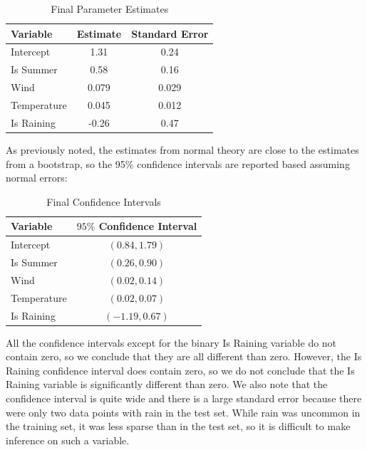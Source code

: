 \documentclass{article}
\begin{document}
\begin{table}
\centering
\begin{tabular}{ | l | c | c |}\hline
  Variable & Estimate & Standard Error \\ \hline
  Intercept & 1.31 & 0.24 \\
  Is Summer & 0.58 & 0.16 \\
  Wind & 0.079 & 0.029 \\
  Temperature & 0.045 & 0.012 \\
  Is Raining & -0.26 &   0.47 \\
  \hline
\end{tabular}
\caption{Final Parameter Estimates}
\label{Parameter Estimates}
\end{table}


As previously noted, the estimates from normal theory are close to the estimates from a bootstrap, so the 95\% confidence intervals are reported based assuming normal errors:
\begin{table}
\centering
\begin{tabular}{  | l | c | }\hline
  Variable & $95\%$  Confidence Interval \\ \hline
  Intercept & $(  0.84,1.79  )$ \\
  Is Summer & $( 0.26,0.90   )$\\
  Wind & $(  0.02,0.14  )$ \\
  Temperature & $(  0.02,0.07  )$ \\
  Is Raining & $(  -1.19,0.67  )$ \\
  \hline
\end{tabular}
\caption{Final Confidence Intervals}
\label{Confidence Intervals}
\end{table}
All the confidence intervals except for the binary Is Raining variable do not contain zero, so we conclude that they are all different than zero.
However, the Is Raining confidence interval does contain zero, so we do not conclude that the Is Raining variable is significantly different than zero.  We also note that the confidence interval is quite wide and there is a large standard error because there were only two data points with rain in the test set. While rain was uncommon in the training set, it was less sparse than in the test set, so it is difficult to make inference on such a variable. 
\end{document}
